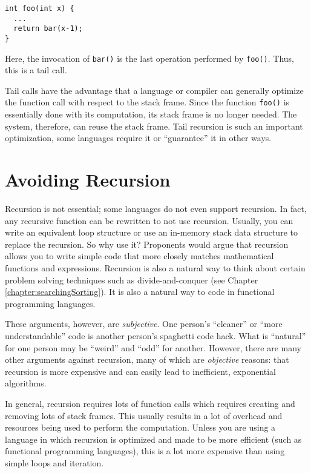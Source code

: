 \begin{verbatim}
int foo(int x) {
  ...
  return bar(x-1);
}
\end{verbatim}

Here, the invocation of \texttt{bar()} is the last operation
performed by \texttt{foo()}.  Thus, this is a tail call.

Tail calls have the advantage that a language or compiler can generally
optimize the function call with respect to the stack frame.  Since the
function \texttt{foo()} is essentially done with its computation, 
its stack frame is no longer needed.  The system, therefore, can reuse
the stack frame.  Tail recursion is such an important optimization, some
languages require it or ``guarantee'' it in other ways.

\section{Avoiding Recursion}

Recursion is not essential; some languages do not even support recursion.
In fact, any recursive function can be rewritten to not use recursion.
Usually, you can write an equivalent loop structure or use an in-memory
\gls{stack} data structure to replace the recursion.
So why use it?  Proponents would argue that recursion allows you to 
write simple code that more closely matches mathematical functions and
expressions.  Recursion is also a natural way to think about certain
problem solving techniques such as divide-and-conquer (see Chapter 
\ref{chapter:searchingSorting}).  It is also a natural way to code
in functional programming languages.

These arguments, however, are \emph{subjective}.  One person's 
``cleaner'' or ``more understandable'' code is another person's 
spaghetti code hack.  What is ``natural'' for one person may be 
``weird'' and ``odd'' for another.  However, there are many other
arguments against recursion, many of which are \emph{objective} 
reasons: that recursion is more expensive and can
easily lead to inefficient, exponential algorithms.

In general, recursion requires lots of function calls which requires 
creating and removing lots of stack frames.  This usually results in 
a lot of overhead and resources being used to perform the computation.  
Unless you are using a language in which recursion is optimized and
made to be more efficient (such as functional programming
languages), this is a lot more expensive than using simple loops and
iteration.  

